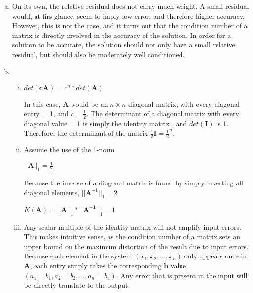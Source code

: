 \documentclass[11pt]{article}
\begin{document}
\begin{enumerate}
\begin{enumerate}[(a)]
		\item On its own, the relative residual does not carry much weight. A small residual would, at firs glance, seem to imply low
		error, and therefore higher accuracy. However, this is not the case, and it turns out that the condition number of a matrix is
		directly involved in the accuracy of the solution. In order for a solution to be accurate, the solution should not only have
		a small relative residual, but should also be moderately well conditioned. \\

		\item
			\begin{enumerate}[i.]

				\item $det(\mathbf{cA}) = c^n*det(\mathbf{A})$

				In this case, $\mathbf{A}$ would be an $n\times n$ diagonal matrix, with every diagonal entry = 1, and $c =
				\frac{1}{2}$. The determinant of a diagonal matrix with every diagonal value = 1 is simply the identity matrix
				, and $det(\mathbf{I})$ is 1. Therefore, the determinant of the matrix $\frac{1}{2}\mathbf{I} =
				\frac{1}{2}^n$. \\

				\item Assume the use of the 1-norm

				$||\mathbf{A}||_1 = \frac{1}{2}$

				Because the inverse of a diagonal matrix is found by simply inverting all diagonal elements, $||\mathbf{A}^{-1}
				||_1 = 2$

				$ K(\mathbf{A}) = ||\mathbf{A}||_1 * ||\mathbf{A^{-1}}||_1 = 1$ \\

				\item Any scalar multiple of the identity matrix will not amplify input errors. This makes intuitive sense, as
				the condition number of a matrix sets an upper bound on the maximum distortion of the result due to input
				errors. Because each element in the system $(x_1, x_2, \dots, x_n)$ only appears once in $\mathbf{A}$,
				each entry simply takes the corresponding $\mathbf{b}$ value $(a_1 = b_1, a_2 = b_2, \dots, a_n = b_n)$.
				Any error that is present in the input will be directly translate to the output. \\

			\end{enumerate}

	\end{enumerate}


\end{enumerate}
\end{document}
